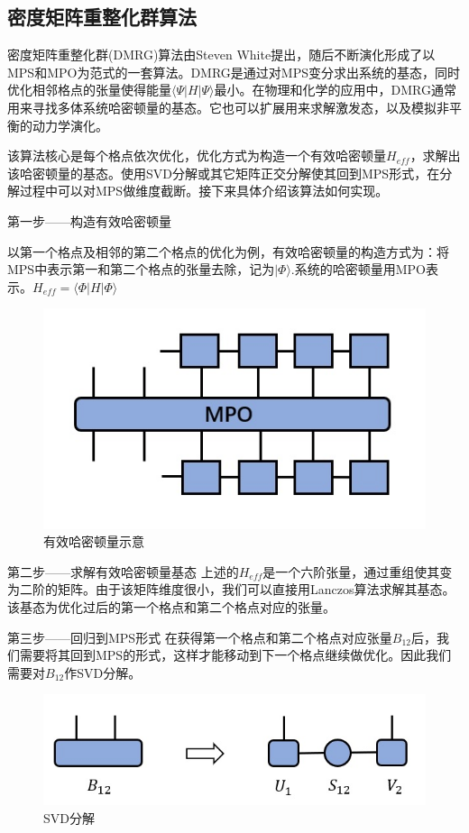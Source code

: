 \documentclass[12pt]{article}
\begin{document}
	  \subsection{密度矩阵重整化群算法}
	  
	  密度矩阵重整化群(DMRG)算法由Steven White提出，随后不断演化形成了以MPS和MPO为范式的一套算法。DMRG是通过对MPS变分求出系统的基态，同时优化相邻格点的张量使得能量$\langle\Psi|H|\Psi\rangle$最小。在物理和化学的应用中，DMRG通常用来寻找多体系统哈密顿量的基态。它也可以扩展用来求解激发态，以及模拟非平衡的动力学演化。
	  
	  该算法核心是每个格点依次优化，优化方式为构造一个有效哈密顿量$H_{eff}$，求解出该哈密顿量的基态。使用SVD分解或其它矩阵正交分解使其回到MPS形式，在分解过程中可以对MPS做维度截断。接下来具体介绍该算法如何实现。\cite{schollwock2011density}
	  
	  {\heiti 第一步——构造有效哈密顿量}
	  
	  以第一个格点及相邻的第二个格点的优化为例，有效哈密顿量的构造方式为：将MPS中表示第一和第二个格点的张量去除，记为$|\Phi\rangle$.系统的哈密顿量用MPO表示。$H_{eff}=\langle\Phi| H|\Phi\rangle$
	  \begin{figure}[H]
	  	\centering
	  	\includegraphics[scale=0.7]{9.有效哈密顿量示意}
	  	\caption[9pt]{ 有效哈密顿量示意}
	  	\label{fig:9}
	  \end{figure}
	  
	  {\heiti 第二步——求解有效哈密顿量基态}
	  上述的$H_{eff}$是一个六阶张量，通过重组使其变为二阶的矩阵。由于该矩阵维度很小，我们可以直接用Lanczos算法求解其基态。该基态为优化过后的第一个格点和第二个格点对应的张量。
	  
	  {\heiti 第三步——回归到MPS形式}
	  在获得第一个格点和第二个格点对应张量$B_{12}$后，我们需要将其回到MPS的形式，这样才能移动到下一个格点继续做优化。因此我们需要对$B_{12}$作SVD分解。
	  \begin{figure}[H]
	  	\centering
	  	\includegraphics[scale=0.7]{10.SVD分解}
	  	\caption[9pt]{ SVD分解}
	  	\label{fig:10}
	  \end{figure}
  
\end{document}

